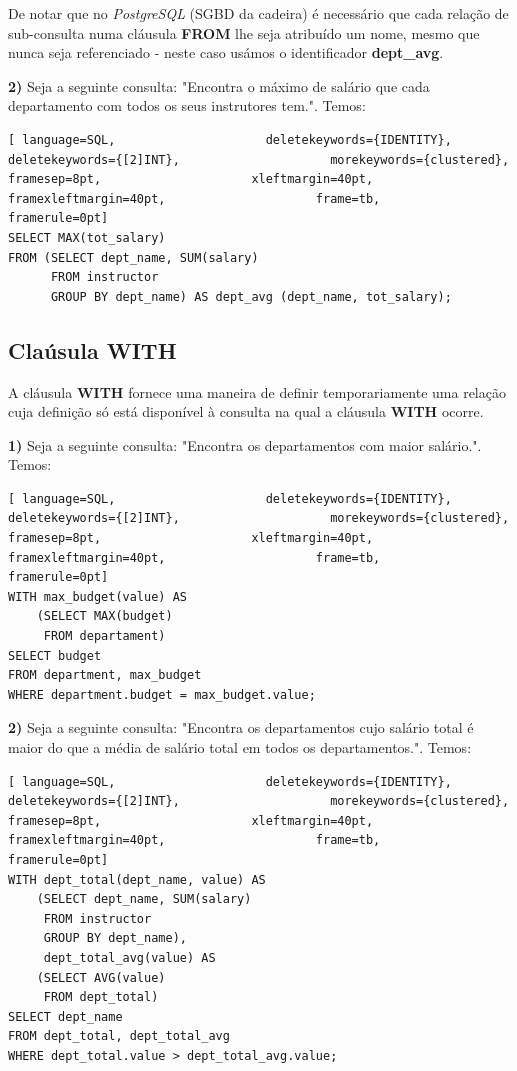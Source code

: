 \documentclass[oneside]{book}
\theoremstyle{definition}
\begin{document}
De notar que no \textit{PostgreSQL} (SGBD da cadeira) é necessário que cada relação de sub-consulta numa cláusula \textbf{FROM} lhe seja atribuído um nome, mesmo que nunca seja referenciado - neste caso usámos o identificador \textbf{dept\_avg}.

\textbf{2)} Seja a seguinte consulta: "Encontra o máximo de salário que cada departamento com todos os seus instrutores tem.". Temos:
\begin{lstlisting}[ language=SQL,                     deletekeywords={IDENTITY},                     deletekeywords={[2]INT},                     morekeywords={clustered},                     framesep=8pt,                     xleftmargin=40pt,                     framexleftmargin=40pt,                     frame=tb,                     framerule=0pt]
SELECT MAX(tot_salary)
FROM (SELECT dept_name, SUM(salary)
      FROM instructor
      GROUP BY dept_name) AS dept_avg (dept_name, tot_salary);
\end{lstlisting}

\subsection{Claúsula WITH}
A cláusula \textbf{WITH} fornece uma maneira de definir temporariamente uma relação cuja definição só está disponível à consulta na qual a cláusula \textbf{WITH} ocorre.

\textbf{1)} Seja a seguinte consulta: "Encontra os departamentos com maior salário.". Temos:
\begin{lstlisting}[ language=SQL,                     deletekeywords={IDENTITY},                     deletekeywords={[2]INT},                     morekeywords={clustered},                     framesep=8pt,                     xleftmargin=40pt,                     framexleftmargin=40pt,                     frame=tb,                     framerule=0pt]
WITH max_budget(value) AS
    (SELECT MAX(budget)
     FROM departament)
SELECT budget
FROM department, max_budget
WHERE department.budget = max_budget.value;
\end{lstlisting}

\textbf{2)} Seja a seguinte consulta: "Encontra os departamentos cujo salário total é maior do que a média de salário total em todos os departamentos.". Temos:
\begin{lstlisting}[ language=SQL,                     deletekeywords={IDENTITY},                     deletekeywords={[2]INT},                     morekeywords={clustered},                     framesep=8pt,                     xleftmargin=40pt,                     framexleftmargin=40pt,                     frame=tb,                     framerule=0pt]
WITH dept_total(dept_name, value) AS
    (SELECT dept_name, SUM(salary)
     FROM instructor
     GROUP BY dept_name),
     dept_total_avg(value) AS 
    (SELECT AVG(value)
     FROM dept_total)
SELECT dept_name
FROM dept_total, dept_total_avg
WHERE dept_total.value > dept_total_avg.value;
\end{lstlisting}
\end{document}
